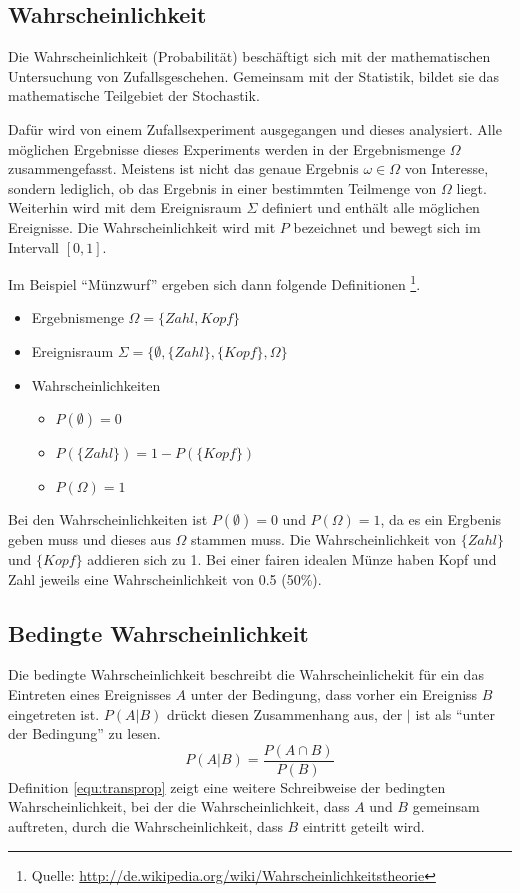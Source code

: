 \subsection{Wahrscheinlichkeit}
\label{sec:prop}
Die Wahrscheinlichkeit (Probabilität) beschäftigt sich mit der mathematischen Untersuchung von Zufallsgeschehen. Gemeinsam mit der  Statistik, bildet sie das mathematische Teilgebiet der Stochastik.

Dafür wird von einem Zufallsexperiment ausgegangen und dieses analysiert. Alle möglichen Ergebnisse dieses Experiments werden in der Ergebnismenge $\Omega$ zusammengefasst. Meistens ist nicht das genaue Ergebnis $\omega \in \Omega$ von Interesse, sondern lediglich, ob das Ergebnis in einer bestimmten Teilmenge von $\Omega$ liegt. Weiterhin wird mit dem Ereignisraum $\Sigma$ definiert und enthält alle möglichen Ereignisse. Die Wahrscheinlichkeit wird mit $P$ bezeichnet und bewegt sich im Intervall $[0, 1]$. 

Im Beispiel ``Münzwurf'' ergeben sich dann folgende Definitionen \footnote{Quelle: \url{http://de.wikipedia.org/wiki/Wahrscheinlichkeitstheorie}}.

\begin{itemize}
\item Ergebnismenge $\Omega = \{Zahl, Kopf\}$
\item Ereignisraum $\Sigma = \{\emptyset, \{Zahl\}, \{Kopf\}, \Omega\}$
\item Wahrscheinlichkeiten
	\begin{itemize}
	\item $P(\emptyset) = 0$
	\item $P(\{Zahl\}) = 1 - P(\{Kopf\})$
	\item $P(\Omega) = 1$
	\end{itemize}
\end{itemize}
Bei den Wahrscheinlichkeiten ist $P(\emptyset) = 0$ und $P(\Omega) = 1$, da es ein Ergbenis geben muss und dieses aus $\Omega$ stammen muss. Die Wahrscheinlichkeit von $\{Zahl\}$ und $\{Kopf\}$ addieren sich zu 1. Bei einer fairen idealen Münze haben Kopf und Zahl jeweils eine Wahrscheinlichkeit von 0.5 (50\%).


\subsection{Bedingte Wahrscheinlichkeit}
\label{sec:condprop}
Die bedingte Wahrscheinlichkeit beschreibt die Wahrscheinlichekit für ein das Eintreten eines Ereignisses $A$ unter der Bedingung, dass vorher ein Ereigniss $B$ eingetreten ist. $P(A | B)$ drückt diesen Zusammenhang aus, der $|$ ist als ``unter der Bedingung'' zu lesen.
\begin{equation}
\label{equ:transprop}
P(A | B) = \frac{P(A \cap B)}{P(B)}
\end{equation}
Definition \ref{equ:transprop} zeigt eine weitere Schreibweise der bedingten Wahrscheinlichkeit, bei der die Wahrscheinlichkeit, dass $A$ und $B$ gemeinsam auftreten, durch die Wahrscheinlichkeit, dass $B$ eintritt geteilt wird.





